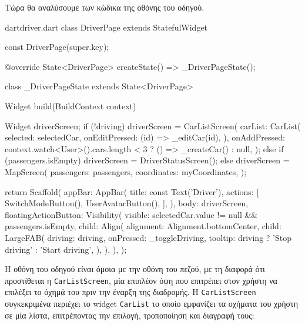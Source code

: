 \documentclass[../thesis.tex]{subfiles}
\begin{document}
Τώρα θα αναλύσουμε των κώδικα της οθόνης του οδηγού.

\begin{codeblock}{dart}{driver.dart}
  class DriverPage extends StatefulWidget {
    const DriverPage({super.key});

    @override
    State<DriverPage> createState() => _DriverPageState();
  }

  class _DriverPageState extends State<DriverPage> {
    Widget build(BuildContext context) {
      Widget driverScreen;
      if (!driving) {
        driverScreen = CarListScreen(
          carList: CarList(
            selected: selectedCar,
            onEditPressed: (id) => _editCar(id),
          ),
          onAddPressed: context.watch<User>().cars.length < 3
              ? () => _createCar()
              : null,
        );
      } else if (passengers.isEmpty) {
        driverScreen = DriverStatusScreen();
      } else {
        driverScreen = MapScreen(
          passengers: passengers,
          coordinates: myCoordinates,
        );
      }

      return Scaffold(
        appBar: AppBar(
          title: const Text('Driver'),
          actions: [
            SwitchModeButton(),
            UserAvatarButton(),
          ],
        ),
        body: driverScreen,
        floatingActionButton: Visibility(
          visible: selectedCar.value != null && passengers.isEmpty,
          child: Align(
            alignment: Alignment.bottomCenter,
            child: LargeFAB(
              driving: driving,
              onPressed: _toggleDriving,
              tooltip: driving ? 'Stop driving' : 'Start driving',
            ),
          ),
        ),
      );
    }
  }
\end{codeblock}

Η οθόνη του οδηγού είναι όμοια με την οθόνη του πεζού, με τη διαφορά ότι προστίθεται η \texttt{CarListScreen}, μία επιπλέον όψη που επιτρέπει στον χρήστη να επιλέξει το όχημά του πριν την έναρξη της διαδρομής.
Η \texttt{CarListScreen} συγκεκριμένα περιέχει το widget \texttt{CarList} το οποίο εμφανίζει τα οχήματα του χρήστη σε μία λίστα, επιτρέποντας την επιλογή, τροποποίηση και διαγραφή τους:
\end{document}
